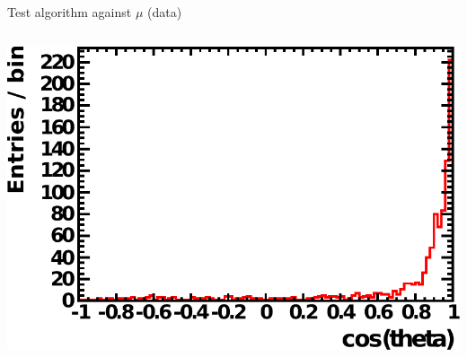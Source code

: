 \documentclass[14pt]{beamer}
\begin{document}
\begin{frame}{Test algorithm against $\mu$ (data)}
\begin{columns}[t]
\begin{block}{\centering{{\fontsize{10pt}{10pt}\selectfont{Agreement
			with $\mu$-fitter\\which uses\\entry/exit points\\~}}}}
			\includegraphics[width=\linewidth]{analyzed_rtq_run005000_agreementWithMuonFitter_t0Peak_prepulseCut1_0_05maxQThres_1000evts.pdf}
		\end{block}
	\end{columns}
\end{frame}
\end{document}
